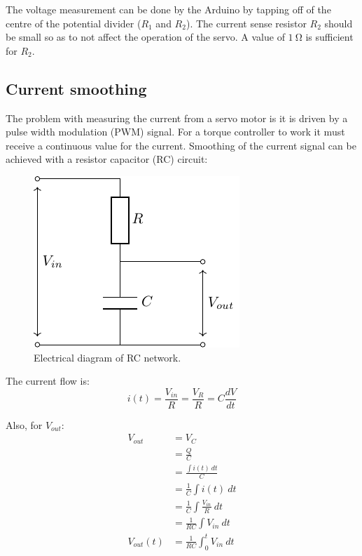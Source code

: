 \documentclass[11pt]{article}
\begin{document}
The voltage measurement can be done by the Arduino by tapping off of the centre of the potential divider ($R_1$ and $R_2$).
The current sense resistor $R_2$ should be small so as to not affect the operation of the servo.
A value of $\SI{1}{\ohm}$ is sufficient for $R_2$.

\newpage
\subsection{Current smoothing}
The problem with measuring the current from a servo motor is it is driven by a pulse width modulation (PWM) signal.
For a torque controller to work it must receive a continuous value for the current.
Smoothing of the current signal can be achieved with a resistor capacitor (RC) circuit:
\begin{figure}[h]
  \centering
  \includegraphics{rc_network_schematic/rc_network_schematic.pdf}
  \caption{Electrical diagram of RC network.}
\end{figure}

The current flow is:
\begin{equation}
    i(t) = \frac{V_{in}}{R}
    = \frac{V_R}{R}
    = C \frac{dV}{dt}
\end{equation}

Also, for $V_{out}$:
\begin{subequations}
  \begin{align}
    V_{out} &= V_C \\
    &= \frac{Q}{C} \\
    &= \frac{\int i(t)~dt}{C} \\
    &= \frac{1}{C} \int i(t)~dt \\
    &= \frac{1}{C} \int \frac{V_{in}}{R}~dt \\
    &= \frac{1}{RC} \int V_{in}~dt \\
    V_{out}(t) &= \frac{1}{RC} \int_0^t V_{in}~dt
  \end{align}
\end{subequations}
\end{document}
